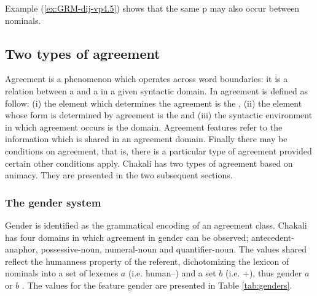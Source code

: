 \begin{exe}
\begin{exe}
\begin{exe}
\begin{exe}
\begin{exe}
\begin{exe}
\begin{exe}
\begin{exe}
\begin{exe}
\begin{exe}
\begin{exe}
Example (\ref{ex:GRM-dij-vp4.5}) shows that the same
p may also occur between
  nominals. 





\subsection{Two types of agreement}
\label{sec:GRM-agrrement}

Agreement is a phenomenon which operates
across word boundaries: it is a relation between a  and a
 in a given syntactic domain. In \citet{Corb06} 
  agreement is defined as follow: (i) the element which determines the
  agreement is the , (ii) the element whose form is determined by
  agreement is the  and (iii) the syntactic environment in which
  agreement occurs is the domain. Agreement features refer to the information
which is shared in an agreement domain. Finally there may be conditions on
  agreement, that  is, there is a particular type of agreement provided certain
  other conditions apply. Chakali has two types of agreement based on animacy.
They are presented in the two subsequent sections. 

\subsubsection{The gender system}
\label{sec:GRM-gender}


Gender is identified as the grammatical encoding of an agreement class.  Chakali has four domains in which agreement in gender can be observed; ante\-cedent-ana\-phor,  possessive-noun, numeral-noun and  quantifier-noun. The values shared reflect the humanness property of the referent, dichotomizing the lexicon of nominals into a set of lexemes $a$ (i.e. human--) and a set $b$ (i.e.  +), thus {\sc gender} $a$ or $b$   \citep{brin08, brin08c}.  The values for the feature {\sc gender} are presented in Table \ref{tab:genders}. 


\begin{table}
  \centering
  \caption{Gender in Chakali}
\label{tab:genders}




\end{table}
\end{exe}
\end{exe}
\end{exe}
\end{exe}
\end{exe}
\end{exe}
\end{exe}
\end{exe}
\end{exe}
\end{exe}
\end{exe}
